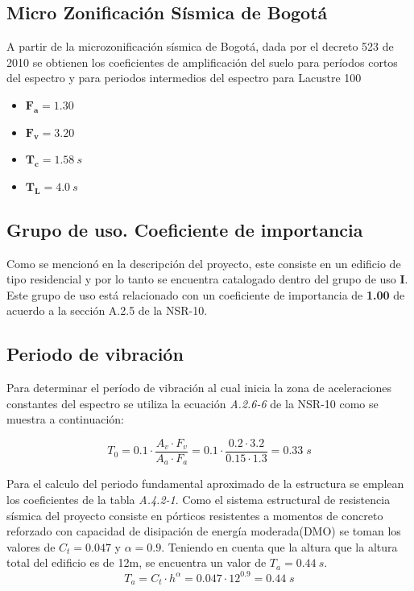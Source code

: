 \documentclass[12pt]{article}
\begin{document}
\subsection{Micro Zonificación Sísmica de Bogotá}
 A partir de la microzonificación sísmica de Bogotá, dada por el decreto 523 de 2010 se obtienen los coeficientes de amplificación del suelo para períodos cortos del espectro y para periodos intermedios del espectro para Lacustre 100
 \begin{itemize}
     \item $\mathbf{F_{a}}=1.30$
     \item $\mathbf{F_{v}}=3.20$
     \item $\mathbf{T_{c}}=1.58~s$
     \item $\mathbf{T_{L}}=4.0~s$
     
 \end{itemize}
\subsection{Grupo de uso. Coeficiente de importancia}

Como se mencionó en la descripción del proyecto, este consiste en un edificio de tipo residencial y por lo tanto se encuentra catalogado dentro del grupo de uso \textbf{I}. Este grupo de uso está relacionado con un coeficiente de importancia de \textbf{1.00} de acuerdo a la sección A.2.5 de la NSR-10.

\subsection{Periodo de vibración}
Para determinar el período de vibración al cual inicia la zona de aceleraciones constantes del espectro se utiliza la ecuación \textit{A.2.6-6} de la NSR-10 como se muestra a continuación:

\begin{equation}
    T_{0}=0.1 \cdot \frac{A_{v}\cdot F_{v}}{A_{a}\cdot F_{a}}=0.1 \cdot \frac{0.2 \cdot 3.2}{0.15 \cdot 1.3}= 0.33\; s 
    \label{eq:calc_T0}
\end{equation}




Para el calculo del periodo fundamental aproximado de la estructura se emplean los coeficientes de la tabla \textit{A.4.2-1}. Como el sistema estructural de resistencia sísmica del proyecto consiste en pórticos resistentes a momentos de concreto reforzado con capacidad de disipación de energía moderada(DMO) se toman los valores de $C_{t}=0.047$ y $\alpha = 0.9$. Teniendo en cuenta que la altura que la altura total del edificio es de 12m, se encuentra un valor de $T_{a}=0.44~s$.
\begin{equation}
    T_{a}=C_{t}\cdot h^{\alpha}=0.047 \cdot 12 ^{0.9}=0.44\;s
\end{equation}
\end{document}
